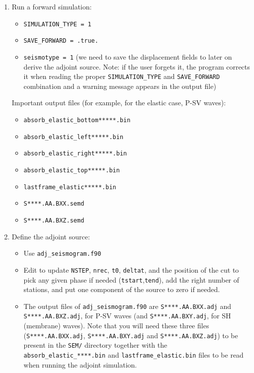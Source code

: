 \documentclass[oneside,english,onecolumn,letterpaper]{book}
\begin{document}
\begin{enumerate}
\item Run a forward simulation:
\begin{itemize}
\item \texttt{SIMULATION\_TYPE = 1}
\item \texttt{SAVE\_FORWARD = .true.}
\item \texttt{seismotype = 1} (we need to save the displacement fields to later on derive the
adjoint source. Note: if the user forgets it, the program corrects it when reading the proper
\texttt{SIMULATION\_TYPE} and \texttt{SAVE\_FORWARD} combination and a warning
message appears in the output file)
\end{itemize}

Important output files (for example, for the elastic case, P-SV waves):
\begin{itemize}
\item \texttt{absorb\_elastic\_bottom*****.bin}
\item \texttt{absorb\_elastic\_left*****.bin}
\item \texttt{absorb\_elastic\_right*****.bin}
\item \texttt{absorb\_elastic\_top*****.bin}
\item \texttt{lastframe\_elastic*****.bin}
\item \texttt{S****.AA.BXX.semd}
\item \texttt{S****.AA.BXZ.semd}
\end{itemize}

\item Define the adjoint source:
\begin{itemize}
\item Use \texttt{adj\_seismogram.f90}
\item Edit to update \texttt{NSTEP}, \texttt{nrec}, \texttt{t0}, \texttt{deltat}, and the position of the cut to pick
any given phase if needed (\texttt{tstart},\texttt{tend}), add the right number of stations, and
put one component of the source to zero if needed.
\item The output files of \texttt{adj\_seismogram.f90} are \texttt{S****.AA.BXX.adj} and \texttt{S****.AA.BXZ.adj}, for P-SV waves (and
\texttt{S****.AA.BXY.adj}, for SH (membrane) waves). Note that you will need these three
files (\texttt{S****.AA.BXX.adj}, \texttt{S****.AA.BXY.adj} and \texttt{S****.AA.BXZ.adj}) to be present in the \texttt{SEM/} directory
together with the \texttt{absorb\_elastic\_****.bin} and \texttt{lastframe\_elastic.bin} files to be read
when running the adjoint simulation.
\end{itemize}


\end{enumerate}
\end{document}

